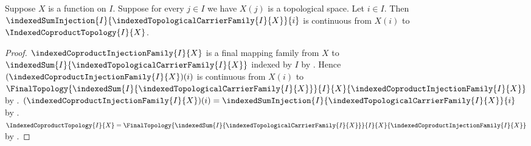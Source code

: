 \begin{theorem}\label{indexed_coproduct_injection_continuous}
    Suppose $X$ is a function on $I$.
    Suppose for every $j\in I$ we have $X(j)$ is a topological space.
    Let $i\in I$.
    Then $\indexedSumInjection{I}{
        \indexedTopologicalCarrierFamily{I}{X}}{i}$ is continuous from
        $X(i)$ to $\IndexedCoproductTopology{I}{X}$.
\end{theorem}
\begin{proof}
    $\indexedCoproductInjectionFamily{I}{X}$ is a final mapping family
        from $X$ to
        $\indexedSum{I}{\indexedTopologicalCarrierFamily{I}{X}}$
        indexed by $I$ by .
    Hence $(\indexedCoproductInjectionFamily{I}{X})(i)$ is continuous
        from $X(i)$ to
        $\FinalTopology{
            \indexedSum{I}{
                \indexedTopologicalCarrierFamily{I}{X}}}{I}{X}{
            \indexedCoproductInjectionFamily{I}{X}}$ by
        .
    $(\indexedCoproductInjectionFamily{I}{X})(i)
        =\indexedSumInjection{I}{
            \indexedTopologicalCarrierFamily{I}{X}}{i}$ by
        .
    $\IndexedCoproductTopology{I}{X}
        =\FinalTopology{
            \indexedSum{I}{
                \indexedTopologicalCarrierFamily{I}{X}}}{I}{X}{
            \indexedCoproductInjectionFamily{I}{X}}$ by
        .
\end{proof}

